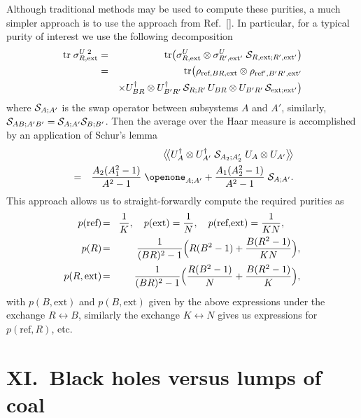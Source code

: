 \documentclass[twocolumn,aps,showpacs,prl]{revtex4}
\begin{document}
Although traditional methods \cite{Melloapp} may be used to compute these
purities, a much simpler approach is to use the approach from
Ref.~[]. In particular, for a typical purity
of interest we use the following decomposition
\begin{eqnarray}
\text{tr}\; \sigma_{R,\text{ext}}^{U\;2}
&=& \text{tr} \bigl( \sigma_{R,\text{ext}}^U
\otimes \sigma_{R',\text{ext}'}^U \;
{\cal S}_{R,\text{ext};R',\text{ext}'}\bigr)\\
&=& \text{tr} \bigl( \rho_{\text{ref},BR,\text{ext}}\otimes
\rho_{\text{ref}',B'R',\text{ext}'}\nonumber\\
&&\times U_{BR}^\dagger\otimes U_{B'R'}^\dagger\,
{\cal S}_{R;R'}\, U_{BR}\otimes U_{B'R'}\,
{\cal S}_{\text{ext};\text{ext}'} \bigr) \nonumber
\end{eqnarray}
where ${\cal S}_{A;A'}$ is the swap operator between 
subsystems $A$ and $A'$, similarly,
${\cal S}_{AB;A'B'}={\cal S}_{A;A'}{\cal S}_{B;B'}$. Then the average
over the Haar measure is accomplished by an application of Schur's
lemma \cite{Abey06app}
\begin{eqnarray}
&&\bigl\langle\!\bigl\langle U_A^\dagger\otimes U_{A'}^\dagger\;
{\cal S}_{A_2;A_2'}\; U_A \otimes U_{A'}\bigr\rangle\!\bigr\rangle
\nonumber \\
&=&\frac{A_2(A_1^2-1)}{A^2-1}\;\openone_{A;A'}
+\frac{A_1(A_2^2-1)}{A^2-1}\;{\cal S}_{A;A'}.
\end{eqnarray}
This approach allows us to straight-forwardly compute the required
purities as
\begin{eqnarray}
p(\text{ref})\!&=&\!\frac{1}{K},\quad
p(\text{ext})=\frac{1}{N},\quad
p(\text{ref,ext})=\frac{1}{KN},~~~~~ \nonumber \\
p(R)\!&=&\!\frac{1}{(BR)^2-1}
\Bigl( R(B^2-1)+\frac{B(R^2-1)}{KN}\Bigr), \label{HJS} \\ %
p(R,\text{ext})\!&=&\!\frac{1}{(BR)^2-1}
\Bigl( \frac{R(B^2-1)}{N}+\frac{B(R^2-1)}{K}\Bigr), \nonumber
\end{eqnarray}
with $p(B,\text{ext})$ and $p(B,\text{ext})$ given by the
above expressions under the exchange $R\leftrightarrow B$, similarly
the exchange $K\leftrightarrow N$ gives us expressions for
$p(\text{ref},R)$, etc.

\section{XI.\ Black holes versus lumps of coal}
\label{coal}
\end{document}

